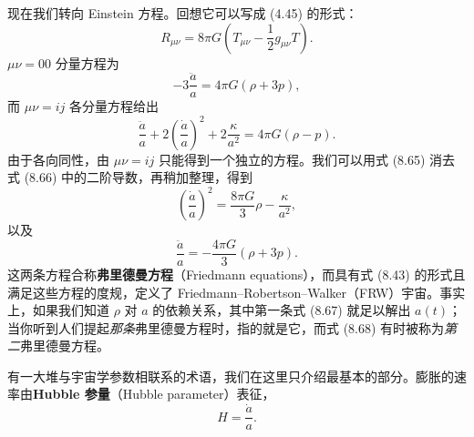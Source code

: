 现在我们转向 Einstein 方程。回想它可以写成 (4.45) 的形式：
\begin{equation*}
R_{\mu\nu} = 8\pi G\left(T_{\mu\nu} - \frac{1}{2}g_{\mu\nu}T\right).
\tag{8.64}
\end{equation*}
$\mu\nu=00$ 分量方程为
\begin{equation*}
-3\frac{\ddot{a}}{a} = 4\pi G(\rho + 3p),
\tag{8.65}
\end{equation*}
而 $\mu\nu=ij$ 各分量方程给出
\begin{equation*}
\frac{\ddot{a}}{a} + 2\left(\frac{\dot{a}}{a}\right)^{2} + 2\frac{\kappa}{a^{2}} = 4\pi G(\rho - p).
\tag{8.66}
\end{equation*}
由于各向同性，由 $\mu\nu=ij$ 只能得到一个独立的方程。我们可以用式 (8.65) 消去式 (8.66) 中的二阶导数，再稍加整理，得到
\begin{equation*}
\boxed{\,\left(\frac{\dot{a}}{a}\right)^{2} = \frac{8\pi G}{3}\rho - \frac{\kappa}{a^{2}},\,}
\tag{8.67}
\end{equation*}
以及
\begin{equation*}
\boxed{\,\frac{\ddot{a}}{a} = -\frac{4\pi G}{3}(\rho + 3p).\,}
\tag{8.68}
\end{equation*}
这两条方程合称\textbf{弗里德曼方程}（Friedmann equations），而具有式 (8.43) 的形式且满足这些方程的度规，定义了 Friedmann--Robertson--Walker（FRW）宇宙。事实上，如果我们知道 $\rho$ 对 $a$ 的依赖关系，其中第一条式 (8.67) 就足以解出 $a(t)$；当你听到人们提起\emph{那条}弗里德曼方程时，指的就是它，而式 (8.68) 有时被称为\emph{第二}弗里德曼方程。

有一大堆与宇宙学参数相联系的术语，我们在这里只介绍最基本的部分。膨胀的速率由\textbf{Hubble 参量}（Hubble parameter）表征，
\begin{equation*}
\boxed{\,H = \frac{\dot{a}}{a}.\,}
\tag{8.69}
\end{equation*}

